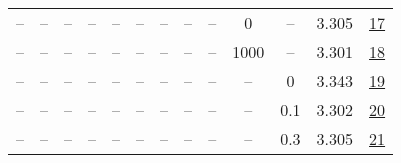 \begin{table}[H]
\begin{tabular}{ccccccccccccc}
-- & -- & -- & -- & -- & -- & -- & -- & -- & 0 & -- & 3.305 & \href{https://wandb.ai/stanford-mercury/optimizer-scaling/runs/sweep-130m-10B-mudamhaeb1a0lr0.004-alr0.008-wd0.2-minlr0-warmup0-197bd3}{17} \\
-- & -- & -- & -- & -- & -- & -- & -- & -- & 1000 & -- & 3.301 & \href{https://wandb.ai/stanford-mercury/optimizer-scaling/runs/sweep-130m-10B-mudamhfe560alr0.004-alr0.008-wd0.2-minlr0-warmup1-c685a8}{18} \\
-- & -- & -- & -- & -- & -- & -- & -- & -- & -- & 0 & 3.343 & \href{https://wandb.ai/stanford-mercury/optimizer-scaling/runs/sweep-130m-10B-mudamh8cc4falr0.004-alr0.008-wd0-minlr0-warmup500-044574}{19} \\
-- & -- & -- & -- & -- & -- & -- & -- & -- & -- & 0.1 & 3.302 & \href{https://wandb.ai/stanford-mercury/optimizer-scaling/runs/sweep-130m-10B-mudamh215ad7lr0.004-alr0.008-wd0.1-minlr0-warmup5-a10de9}{20} \\
-- & -- & -- & -- & -- & -- & -- & -- & -- & -- & 0.3 & 3.305 & \href{https://wandb.ai/stanford-mercury/optimizer-scaling/runs/sweep-130m-10B-mudamh26ce34lr0.004-alr0.008-wd0.3-minlr0-warmup5-8441eb}{21} \\
\bottomrule
\end{tabular}
\end{table}

